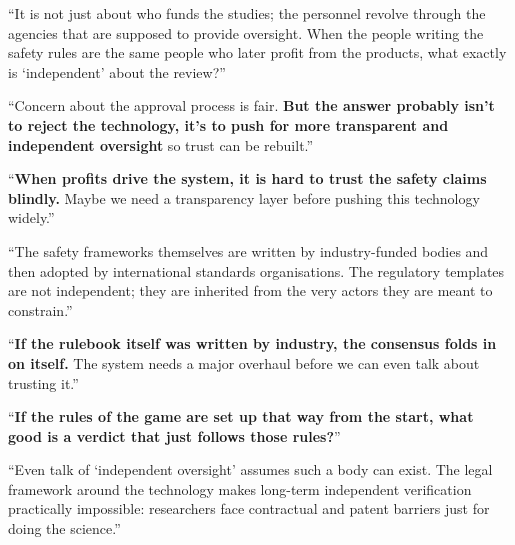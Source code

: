 \begin{casebox}



\textcolor{malRed}{``It is not just about who funds the studies; the personnel revolve through the agencies that are supposed to provide oversight. When the people writing the safety rules are the same people who later profit from the products, what exactly is `independent' about the review?''}

``Concern about the approval process is fair. \textbf{But the answer probably isn't to reject the technology, it's to push for more transparent and independent oversight} so trust can be rebuilt.''

``\textbf{When profits drive the system, it is hard to trust the safety claims blindly.} Maybe we need a transparency layer before pushing this technology widely.''


\textcolor{malRed}{``The safety frameworks themselves are written by industry-funded bodies and then adopted by international standards organisations. The regulatory templates are not independent; they are inherited from the very actors they are meant to constrain.''}

``\textbf{If the rulebook itself was written by industry, the consensus folds in on itself.} The system needs a major overhaul before we can even talk about trusting it.''

``\textbf{If the rules of the game are set up that way from the start, what good is a verdict that just follows those rules?}''


\textcolor{malRed}{``Even talk of `independent oversight' assumes such a body can exist. The legal framework around the technology makes long-term independent verification practically impossible: researchers face contractual and patent barriers just for doing the science.''}


\end{casebox}
